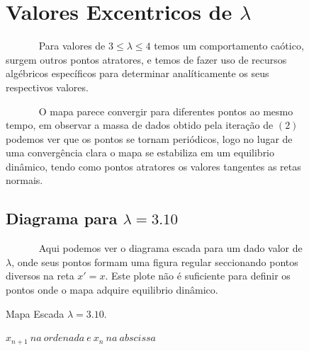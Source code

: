 \documentclass[pdftex,12pt,a4paper]{article}
\begin{document}
\begin{figure}

\section{Valores Excentricos de $\lambda$}
~~~~~~ Para valores de $3 \leq \lambda \leq 4$ temos um comportamento caótico, surgem outros pontos atratores, e temos de fazer uso de recursos algébricos específicos para determinar analíticamente os seus respectivos valores.\

~~~~~~ O mapa parece convergir para diferentes pontos ao mesmo tempo, em observar a massa de dados obtido pela iteração de $(2)$ podemos ver que os pontos se tornam periódicos, logo no lugar de uma convergência clara o mapa se estabiliza em um equilibrio dinâmico, tendo como pontos atratores os valores tangentes as retas normais.

\subsection{Diagrama para $\lambda = 3.10$}
~~~~~~ Aqui podemos ver o diagrama escada para um dado valor de $\lambda$, onde seus pontos formam uma figura regular seccionando pontos diversos na reta $x'=x$. Este plote não é suficiente para definir os pontos onde o mapa adquire equilibrio dinâmico.\

\centering
\caption{Mapa Escada $\lambda = 3.10$.}
\caption*{$x_{n+1}\ na\ ordenada\ e\ x_{n}\ na\ abscissa$ }
\end{figure}
\end{document}
